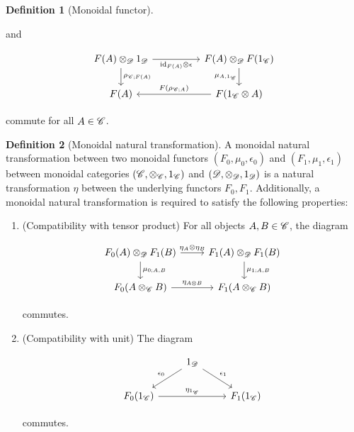 \documentclass{article}
\theoremstyle{definition}
\newtheorem*{definition}{Definition}
\numberwithin{figure}{section}
\begin{document}
\begin{definition}[Monoidal functor]
\begin{enumerate}
and

\[\begin{tikzcd}
	{F(A)\otimes_{\Dcat}1_{\Dcat}} && {F(A)\otimes_{\Dcat}F(1_{\Ccat})} \\
	{F(A)} && {F(1_{\Ccat}\otimes A)}
	\arrow["{\rho_{\Ccat;F(A)}}", from=1-1, to=2-1]
	\arrow["{F(\rho_{\Ccat;A})}"', from=2-3, to=2-1]
	\arrow["{\mu_{A,1_{\Ccat}}}"', from=1-3, to=2-3]
	\arrow["{\id_{F(A)}\otimes\epsilon}"', from=1-1, to=1-3]
\end{tikzcd}\]

commute for all $A\in \mathscr{C}$.
\end{enumerate}

\raggedleft\qedsymbol{}
\end{definition}

\begin{definition}[Monoidal natural transformation] A monoidal natural transformation between two monoidal functors $(F_0,\mu_0,\epsilon_0)$ and $(F_1,\mu_1,\epsilon_1)$ between monoidal categories $(\mathscr{C},\otimes_{\mathscr{C}},1_{\mathscr{C}})$ and $(\mathscr{D},\otimes_{\mathscr{D}},1_{\mathscr{D}})$ is a natural transformation $\eta$ between the underlying functors $F_0,F_1$. Additionally, a monoidal natural transformation is required to satisfy the following properties:

\begin{enumerate}
\item (Compatibility with tensor product) For all objects $A,B\in \mathscr{C}$, the diagram

\[\begin{tikzcd}
	{F_0(A)\otimes_{\Dcat}F_1(B)} & {F_1(A)\otimes_{\Dcat}F_1(B)} \\
	{F_0(A\otimes_{\Ccat} B)} & {F_1(A\otimes_{\Ccat} B)}
	\arrow["{\mu_{0;A,B}}", from=1-1, to=2-1]
	\arrow["{\mu_{1;A,B}}", from=1-2, to=2-2]
	\arrow["{\eta_A\otimes \eta_B}", from=1-1, to=1-2]
	\arrow["{\eta_{A\otimes B}}", from=2-1, to=2-2]
\end{tikzcd}\]

commutes.

\item (Compatibility with unit) The diagram

\[\begin{tikzcd}
	& {1_{\Dcat}} \\
	{F_0(1_{\Ccat})} && {F_1(1_{\Ccat})}
	\arrow["{\eta_{1_{\Ccat}}}", from=2-1, to=2-3]
	\arrow["{\epsilon_0}"', from=1-2, to=2-1]
	\arrow["{\epsilon_1}", from=1-2, to=2-3]
\end{tikzcd}\]

commutes.
\end{enumerate}
\raggedleft\qedsymbol{}
\end{definition}
\end{document}
